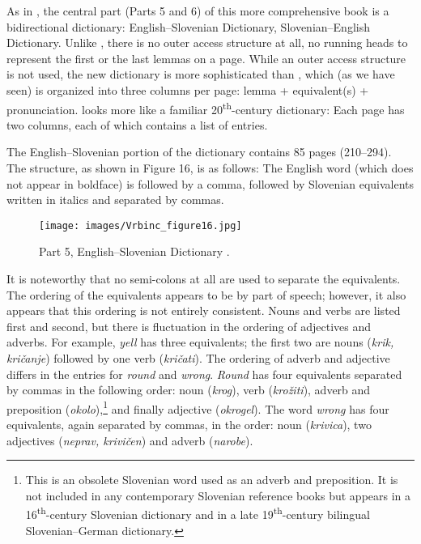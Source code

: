 \documentclass[output=paper,colorlinks,citecolor=brown,arabicfont,chinesefont]{langscibook}
\begin{document}
As in \citet{Kubelka1904}, the central part (Parts 5 and 6) of this more comprehensive book is a bidirectional dictionary: English–Slovenian Dictionary, Slovenian–English Dictionary. Unlike \citet{Kubelka1904}, there is no outer access structure at all, no running heads to represent the first or the last lemmas on a page. While an outer access structure is not used, the new dictionary is more sophisticated than \citet{Kubelka1904}, which (as we have seen) is organized into three columns per page: lemma + equivalent(s) + pronunciation. \citet{Kubelka1912b} looks more like a familiar 20\textsuperscript{th}-century dictionary: Each page has two columns, each of which contains a list of entries.

The English–Slovenian portion of the dictionary contains 85 pages (210–294). The structure, as shown in Figure 16, is as follows: The English word (which does not appear in boldface) is followed by a comma, followed by Slovenian equivalents written in italics and separated by commas. 

\begin{figure}
\texttt{[image: images/Vrbinc\_figure16.jpg]}
\caption{{Part 5, English–Slovenian Dictionary \citep[254]{Kubelka1912b}.}}
\label{Figure 16}
\end{figure}

It is noteworthy that no semi-colons at all are used to separate the equivalents. The ordering of the equivalents appears to be by part of speech; however, it also appears that this ordering is not entirely consistent. Nouns and verbs are listed first and second, but there is fluctuation in the ordering of adjectives and adverbs. For example, \emph{yell} has three equivalents; the first two are nouns (\emph{krik, kričanje}) followed by one verb (\emph{kričati}). The ordering of adverb and adjective differs in the entries for \emph{round} and \emph{wrong}. \emph{Round} has four equivalents separated by commas in the following order: noun (\emph{krog}), verb (\emph{krožiti}), adverb and preposition (\emph{okolo}),\footnote{This is an obsolete Slovenian word used as an adverb and preposition. It is not included in any contemporary Slovenian reference books but appears in a 16\textsuperscript{th}-century Slovenian dictionary and in a late 19\textsuperscript{th}-century bilingual Slovenian–German dictionary.} and finally adjective (\emph{okrogel}). The word \emph{wrong} has four equivalents, again separated by commas, in the order: noun (\emph{krivica}), two adjectives (\emph{neprav, krivičen}) and adverb (\emph{narobe}).
\end{document}
